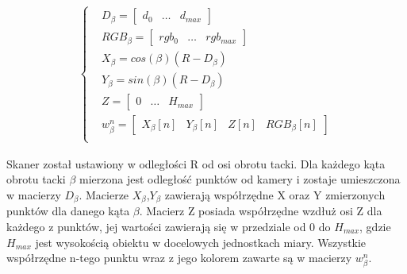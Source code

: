 \begin{equation}
    \begin{aligned}
    \begin{cases}
            & D_{\beta}=\begin{bmatrix}d_{0} & \dots & d_{max} \end{bmatrix}  \\
            & RGB_{\beta}=\begin{bmatrix}rgb_{0} & \dots & rgb_{max} \end{bmatrix}  \\
            & X_{\beta}=cos(\beta)(R-D_{\beta})  \\
            & Y_{\beta}=sin(\beta)(R-D_{\beta})  \\
          & Z=\begin{bmatrix} 0 & \dots & H_{max} \end{bmatrix}  \\
          & w_{\beta}^n=\begin{bmatrix} X_{\beta}[n] & Y_{\beta}[n] & Z[n] & RGB_{\beta}[n]\end{bmatrix}  \\
    \end{cases}
    \end{aligned}
    \label{equ:chmuraPunktow}
\end{equation}

Skaner został ustawiony w odległości R od osi obrotu tacki. Dla każdego kąta obrotu tacki $\beta$ mierzona jest odległość punktów od kamery i zostaje umieszczona w macierzy $D_{\beta}$. Macierze $X_{\beta}$,$Y_{\beta}$ zawierają współrzędne X oraz Y zmierzonych punktów dla danego kąta $\beta$. Macierz Z posiada współrzędne wzdłuż osi Z dla każdego z punktów, jej wartości zawierają się w przedziale od 0 do $H_{max}$, gdzie $H_{max}$ jest wysokością obiektu w docelowych jednostkach miary. Wszystkie współrzędne n-tego punktu wraz z jego kolorem zawarte są w macierzy  $w_{\beta}^n$.

